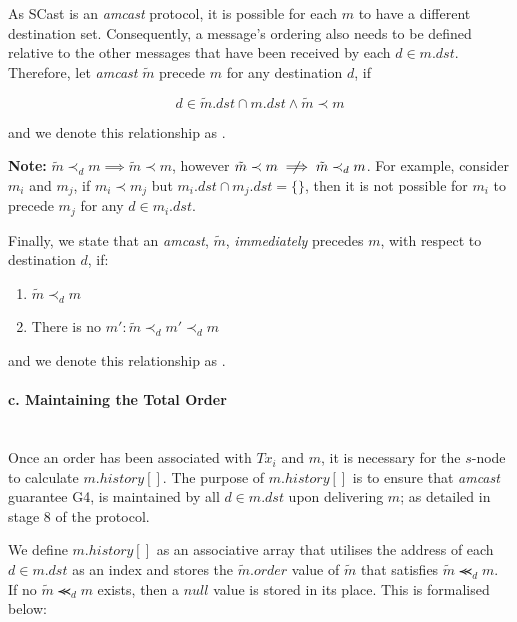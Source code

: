 \begin{enumerate}
        As \textsf{SCast} is an \emph{amcast} protocol, it is possible for each $m$ to have a different destination set.  Consequently, a message's ordering also needs to be defined relative to the other messages that have been received by each $d \in m.dst$.  Therefore, let \emph{amcast} $\tilde{m}$ precede $m$ for any destination $d$, if
        
        \begin{equation*}
            d \in \tilde{m}.dst \cap m.dst \land \tilde{m} \prec m
        \end{equation*}
        
        and we denote this relationship as  .  
        
        \textbf{Note: } $\tilde{m} \prec_d m \implies  \tilde{m} \prec m$, however $\tilde{m} \prec m \centernot\implies \tilde{m} \prec_d m$.  For example, consider $m_i$ and $m_j$, if $m_i \prec m_j$ but $m_i.dst \cap m_j.dst = \{\}$, then it is not possible for $m_i$ to precede $m_j$ for any $d \in m_i.dst$.  
        
        Finally, we state that an \emph{amcast}, $\tilde{m}$, \emph{immediately} precedes $m$, with respect to destination $d$, if:

        \begin{enumerate}[label={(\roman*)}, leftmargin=5em]
            \item    $\tilde{m} \prec_d m$
            \item    There is no $m' : \tilde{m} \prec_d m' \prec_d m$
        \end{enumerate}
        
        and we denote this relationship as .  
        
        \paragraph{c. Maintaining the Total Order} \hfill \\
         Once an order has been associated with $Tx_i$ and $m$, it is necessary for the $s$-node to calculate $m.history[]$.  The purpose of $m.history[]$ is to ensure that \emph{amcast} guarantee G4, is maintained by all $d \in m.dst$ upon delivering $m$; as detailed in stage $8$ of the protocol.  
         
         We define $m.history[]$ as an associative array that utilises the address of each $d \in m.dst$ as an index and stores the $\tilde{m}.order$ value of $\tilde{m}$ that satisfies $\tilde{m} \llcurly_d m$.  If no $\tilde{m} \llcurly_d m$ exists, then a $null$ value is stored in its place.  This is formalised below:
         

\end{enumerate}

